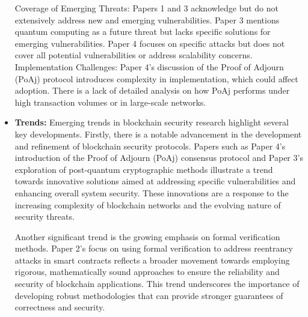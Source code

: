 \documentclass[12pt,a4paper]{article}
\begin{document}
\begin{itemize}
Coverage of Emerging Threats: Papers 1 and 3 acknowledge but do not extensively address new and emerging vulnerabilities. Paper 3 mentions quantum computing as a future threat but lacks specific solutions for emerging vulnerabilities. Paper 4 focuses on specific attacks but does not cover all potential vulnerabilities or address scalability concerns.
\\
Implementation Challenges: Paper 4’s discussion of the Proof of Adjourn (PoAj) protocol introduces complexity in implementation, which could affect adoption. There is a lack of detailed analysis on how PoAj performs under high transaction volumes or in large-scale networks.
    \item \textbf{Trends:} 
Emerging trends in blockchain security research highlight several key developments. Firstly, there is a notable advancement in the development and refinement of blockchain security protocols. Papers such as Paper 4’s introduction of the Proof of Adjourn (PoAj) consensus protocol and Paper 3’s exploration of post-quantum cryptographic methods illustrate a trend towards innovative solutions aimed at addressing specific vulnerabilities and enhancing overall system security. These innovations are a response to the increasing complexity of blockchain networks and the evolving nature of security threats.

Another significant trend is the growing emphasis on formal verification methods. Paper 2’s focus on using formal verification to address reentrancy attacks in smart contracts reflects a broader movement towards employing rigorous, mathematically sound approaches to ensure the reliability and security of blockchain applications. This trend underscores the importance of developing robust methodologies that can provide stronger guarantees of correctness and security.


\end{itemize}
\end{document}
